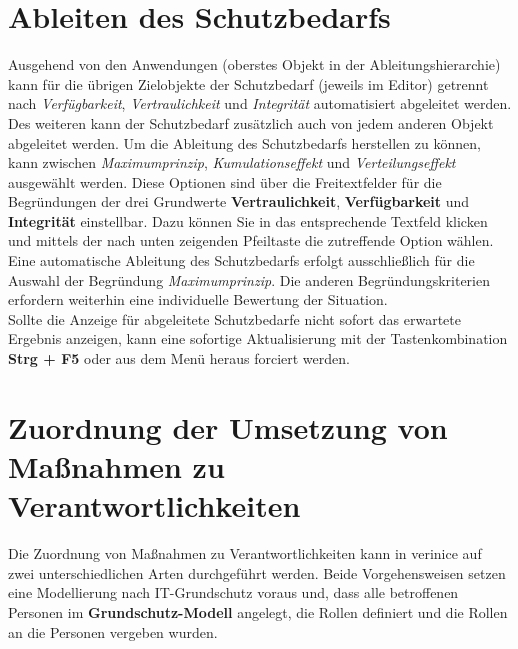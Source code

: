 \documentclass[a4paper,10pt]{book}
\begin{document}
\section{Ableiten des Schutzbedarfs}
Ausgehend von den Anwendungen (oberstes Objekt in der Ableitungshierarchie) kann für die übrigen Zielobjekte der Schutzbedarf (jeweils im Editor) getrennt nach \textit{Verfügbarkeit}, \textit{Vertraulichkeit} und \textit{Integrität} automatisiert abgeleitet werden. Des weiteren kann der Schutzbedarf zusätzlich auch von jedem anderen Objekt abgeleitet werden.
Um die Ableitung des Schutzbedarfs herstellen zu können, kann zwischen \textit{Maximumprinzip}, \textit{Kumulationseffekt} und \textit{Verteilungseffekt} ausgewählt werden. Diese Optionen sind über die Freitextfelder für die Begründungen der drei Grundwerte \textbf{Vertraulichkeit}, \textbf{Verfügbarkeit} und \textbf{Integrität} einstellbar. Dazu können Sie in das entsprechende Textfeld klicken und mittels der nach unten zeigenden Pfeiltaste die zutreffende Option wählen.
Eine automatische Ableitung des Schutzbedarfs erfolgt ausschließlich für die Auswahl der Begründung \textit{Maximumprinzip}. Die anderen Begründungskriterien erfordern weiterhin eine individuelle Bewertung der Situation.
\newline\\
Sollte die Anzeige für abgeleitete Schutzbedarfe nicht sofort das erwartete Ergebnis anzeigen, kann eine sofortige Aktualisierung mit der Tastenkombination \textbf{Strg + F5} oder aus dem Menü heraus forciert werden.

\section{Zuordnung der Umsetzung von Maßnahmen zu Verantwortlichkeiten}
Die Zuordnung von Maßnahmen zu Verantwortlichkeiten kann in verinice auf zwei unterschiedlichen Arten durchgeführt werden. Beide Vorgehensweisen setzen eine Modellierung nach IT-Grundschutz voraus und, dass alle betroffenen Personen im \textbf{Grundschutz-Modell} angelegt, die Rollen definiert und die Rollen an die Personen vergeben wurden.
\end{document}
